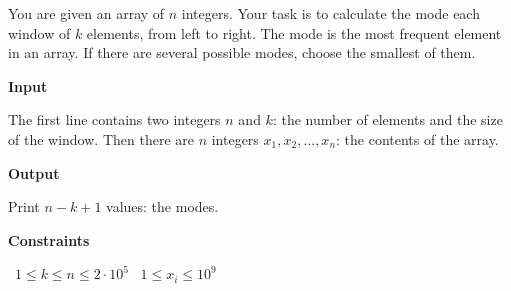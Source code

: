 You are given an array of $n$ integers. Your task is to calculate the mode each window of $k$ elements, from left to right.
The mode is the most frequent element in an array. If there are several possible modes, choose the smallest of them.

\vspace{0.3cm}\noindent\textbf{Input}

The first line contains two integers $n$ and $k$: the number of elements and the size of the window.
Then there are $n$ integers $x_1,x_2,\ldots,x_n$: the contents of the array.

\vspace{0.3cm}\noindent\textbf{Output}

Print $n-k+1$ values: the modes.

\vspace{0.3cm}\noindent\textbf{Constraints}

\textbullet\ $1 \le k \le n \le 2 \cdot 10^5$
\textbullet\ $1 \le x_i \le 10^9$